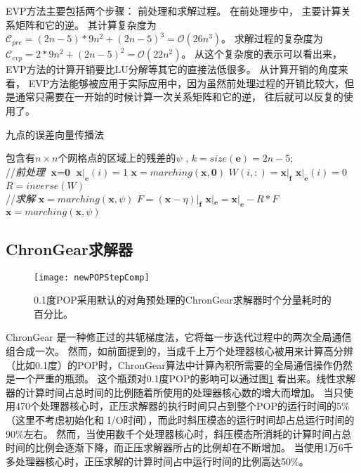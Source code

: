  
EVP方法主要包括两个步骤： 前处理和求解过程。 
在前处理步中， 主要计算关系矩阵和它的逆。 其计算复杂度为$\mathcal{C}_{pre}=
(2n-5)* 9n^2 + (2n-5)^3 = \mathcal {O} (26n^3)$。 
求解过程的复杂度为$\mathcal{C}_{evp}= 2* 9n^2 + (2n-5)^2 = \mathcal{O} (22n^2)$。 
从这个复杂度的表示可以看出来，EVP方法的计算开销要比LU分解等其它的直接法低很多。 
从计算开销的角度来看， EVP方法能够被应用于实际应用中，因为虽然前处理过程的开销比较大，但是通常只需要在一开始的时候计算一次关系矩阵和它的逆， 往后就可以反复的使用了。

\begin{algorithm}[t!]
\caption{九点的误差向量传播法}
\label{alg:evp}
\begin{algorithmic}[1]
\REQUIRE 包含有$n\times n$个网格点的区域上的残差的$\psi$ , $k = size(\textbf{e})=2n-5$; \\
//\qquad \textit{前处理}
\STATE  $\textbf{x} = \textbf{0}$
\STATE $\textbf{x}|_\textbf{e}(i) = 1$
\STATE $\textbf{x} = marching(\textbf{x},\textbf{0})$
\STATE $W(i,:) = \textbf{x}|_\textbf{f}$
\STATE $\textbf{x}|_\textbf{e}(i) = 0$
\ENDFOR
\STATE $R = inverse(W)$ \\
//\qquad \textit{求解 }
\STATE $\textbf{x}= marching(\textbf{x},\psi)$
\STATE $F = (\textbf{x} - \eta)|_\textbf{f}$
\STATE $\textbf{x}|_\textbf{e} =\textbf{x}|_\textbf{e} - R*F$
\STATE $\textbf{x} = marching(\textbf{x},\psi)$
\end{algorithmic}
\end{algorithm}

\subsection{ChronGear求解器}
\begin {figure}
\centering
\texttt{[image: newPOPStepComp]}
\caption[] {0.1度POP采用默认的对角预处理的ChronGear求解器时个分量耗时的百分比。\label{fig:StepComp}}
\end{figure}

ChronGear \cite{dAzevedo1999lapack} 是一种修正过的共轭梯度法，它将每一步迭代过程中的两次全局通信组合成一次。
然而，如前面提到的，当成千上万个处理器核心被用来计算高分辨（比如0.1度）的POP时，ChronGear算法中计算內积所需要的全局通信操作仍然是一个严重的瓶颈。
这个瓶颈对0.1度POP的影响可以通过图\ref{fig:StepComp} 看出来。线性求解器的计算时间占总时间的比例随着所使用的处理器核心数的增大而增加。
当只使用470个处理器核心时，正压求解器的执行时间只占到整个POP的运行时间的5\% （这里不考虑初始化和 I/O时间），而此时斜压模态的运行时间却占总运行时间的90\%左右。
然而，当使用数千个处理器核心时，斜压模态所消耗的计算时间占总时间的比例会逐渐下降，而正压求解器所占的比例却在不断增加。
当使用1万6千多处理器核心时，正压求解的计算时间占中运行时间的比例高达50\%。 

